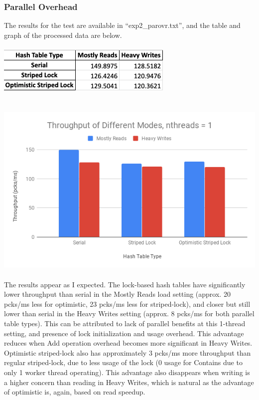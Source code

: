 \documentclass{article}
\begin{document}
\begin{adjustwidth}{-2cm}{-2cm}
\subsubsection{Parallel Overhead}
The results for the test are available in ``exp2\_parovr.txt'', and the table and graph of the processed data are below.\\
\null\\
\includegraphics[width=\linewidth]{e2_data.png}\\ \null\\
\null\\
\includegraphics[width=\linewidth]{e2_graph.png}\\ \null\\
The results appear as I expected. The lock-based hash tables have significantly lower throughput than serial in the Mostly Reads load setting (approx. 20 pcks/ms less for optimistic, 23 pcks/ms less for striped-lock), and closer but still lower than serial in the Heavy Writes setting (approx. 8 pcks/ms for both parallel table types). This can be attributed to lack of parallel benefits at this 1-thread setting, and presence of lock initialization and usage overhead. This advantage reduces when Add operation overhead becomes more significant in Heavy Writes.\\
Optimistic striped-lock also has approximately 3 pcks/ms more throughput than regular striped-lock, due to less usage of the lock (0 usage for Contains due to only 1 worker thread operating). This advantage also disappears when writing is a higher concern than reading in Heavy Writes, which is natural as the advantage of optimistic is, again, based on read speedup.

\end{adjustwidth}
\end{document}
